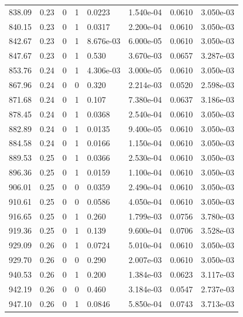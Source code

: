 \documentclass[preview]{standalone}
\begin{document}
{{{{{\begin{tabular}{L{1.2cm}C{1.2cm} C{0.3cm}C{0.5cm} C{1.4cm}C{1.4cm} C{1.4cm}C{1.4cm}}
  838.09  &  0.23  & 0     &  1 &  0.0223  & 1.540e-04  & 0.0610 &  3.050e-03   \\ 
  840.15  &  0.23  & 0     &  1 &  0.0317  & 2.200e-04  & 0.0610 &  3.050e-03   \\ 
  842.67  &  0.23  & 0     &  1 &  8.676e-03  & 6.000e-05  & 0.0610 &  3.050e-03   \\ 
  847.67  &  0.23  & 0     &  1 &  0.530  & 3.670e-03  & 0.0657 &  3.287e-03   \\ 
  853.76  &  0.24  & 0     &  1 &  4.306e-03  & 3.000e-05  & 0.0610 &  3.050e-03   \\ 
  867.96  &  0.24  & 0     &  0 &  0.320  & 2.214e-03  & 0.0520 &  2.598e-03   \\ 
  871.68  &  0.24  & 0     &  1 &  0.107  & 7.380e-04  & 0.0637 &  3.186e-03   \\ 
  878.45  &  0.24  & 0     &  1 &  0.0368  & 2.540e-04  & 0.0610 &  3.050e-03   \\ 
  882.89  &  0.24  & 0     &  1 &  0.0135  & 9.400e-05  & 0.0610 &  3.050e-03   \\ 
  884.58  &  0.24  & 0     &  1 &  0.0166  & 1.150e-04  & 0.0610 &  3.050e-03   \\ 
  889.53  &  0.25  & 0     &  1 &  0.0366  & 2.530e-04  & 0.0610 &  3.050e-03   \\ 
  896.36  &  0.25  & 0     &  1 &  0.0159  & 1.100e-04  & 0.0610 &  3.050e-03   \\ 
  906.01  &  0.25  & 0     &  0 &  0.0359  & 2.490e-04  & 0.0610 &  3.050e-03   \\ 
  910.61  &  0.25  & 0     &  0 &  0.0586  & 4.050e-04  & 0.0610 &  3.050e-03   \\ 
  916.65  &  0.25  & 0     &  1 &  0.260  & 1.799e-03  & 0.0756 &  3.780e-03   \\ 
  919.36  &  0.25  & 0     &  1 &  0.139  & 9.600e-04  & 0.0706 &  3.528e-03   \\ 
  929.09  &  0.26  & 0     &  1 &  0.0724  & 5.010e-04  & 0.0610 &  3.050e-03   \\ 
  929.70  &  0.26  & 0     &  0 &  0.290  & 2.007e-03  & 0.0610 &  3.050e-03   \\ 
  940.53  &  0.26  & 0     &  1 &  0.200  & 1.384e-03  & 0.0623 &  3.117e-03   \\ 
  942.19  &  0.26  & 0     &  0 &  0.460  & 3.184e-03  & 0.0547 &  2.737e-03   \\ 
  947.10  &  0.26  & 0     &  1 &  0.0846  & 5.850e-04  & 0.0743 &  3.713e-03   \\ 

\end{tabular}}}}}}
\end{document}
